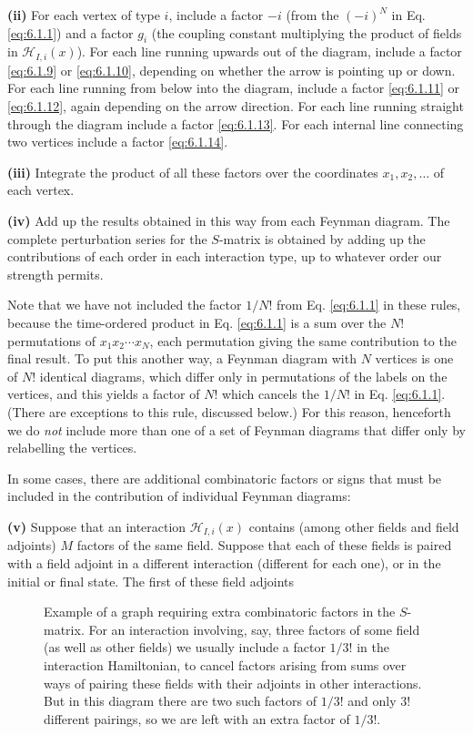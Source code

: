\noindent\textbf{(ii)} For each vertex of type $i$, include a factor $-i$
(from the $(-i)^N$ in Eq. \eqref{eq:6.1.1}) and a factor $g_i$ (the coupling constant
multiplying the product of fields in $\mathcal H_{I,i}(x)$). For each line
running upwards out of the diagram, include a factor \eqref{eq:6.1.9} or \eqref{eq:6.1.10},
depending on whether the arrow is pointing up or down. For each line running
from below into the diagram, include a factor \eqref{eq:6.1.11} or \eqref{eq:6.1.12}, again
depending on the arrow direction. For each line running straight through the
diagram include a factor \eqref{eq:6.1.13}. For each internal line connecting two
vertices include a factor \eqref{eq:6.1.14}.

\noindent\textbf{(iii)} Integrate the product of all these factors over the
coordinates $x_1,x_2,\ldots$ of each vertex.

\noindent\textbf{(iv)} Add up the results obtained in this way from each
Feynman diagram. The complete perturbation series for the $S$-matrix is
obtained by adding up the contributions of each order in each interaction
type, up to whatever order our strength permits.

Note that we have not included the factor $1/N!$ from Eq. \eqref{eq:6.1.1} in these
rules, because the time-ordered product in Eq. \eqref{eq:6.1.1} is a sum over the $N!$
permutations of $x_1x_2\cdots x_N$, each permutation giving the same
contribution to the final result. To put this another way, a Feynman diagram
with $N$ vertices is one of $N!$ identical diagrams, which differ only in
permutations of the labels on the vertices, and this yields a factor of $N!$
which cancels the $1/N!$ in Eq. \eqref{eq:6.1.1}. (There are exceptions to this rule,
discussed below.) For this reason, henceforth we do \emph{not} include more
than one of a set of Feynman diagrams that differ only by relabelling the
vertices.

In some cases, there are additional combinatoric factors or signs that must be
included in the contribution of individual Feynman diagrams:

\noindent\textbf{(v)} Suppose that an interaction $\mathcal H_{I,i}(x)$
contains (among other fields and field adjoints) $M$ factors of the same field.
Suppose that each of these fields is paired with a field adjoint in a different
interaction (different for each one), or in the initial or final state. The
first of these field adjoints
\begingroup
\renewcommand{\thefigure}{6.\arabic{figure}}
\setcounter{figure}{1}
\begin{figure}[htbp]

\caption{Example of a graph requiring extra combinatoric factors in the
$S$-matrix. For an interaction involving, say, three factors of some field (as
well as other fields) we usually include a factor $1/3!$ in the interaction
Hamiltonian, to cancel factors arising from sums over ways of pairing these
fields with their adjoints in other interactions. But in this diagram there
are two such factors of $1/3!$ and only $3!$ different pairings, so we are left
with an extra factor of $1/3!$.}
\label{fig:6.2}
\end{figure}
\endgroup

